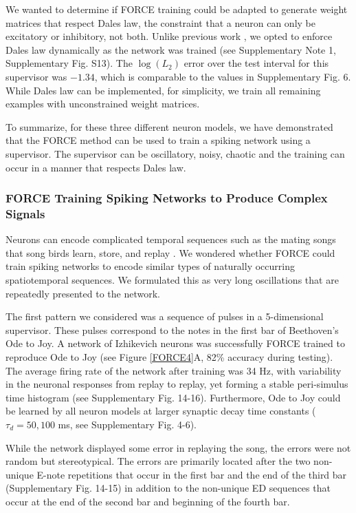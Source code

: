 \documentclass[11pt]{article} %
\begin{document}
We wanted to determine if FORCE training could be adapted to generate weight matrices that respect Dales law, the constraint that a neuron can only be excitatory or inhibitory, not both.  Unlike previous work \cite{FORCE2}, we opted to enforce Dales law dynamically as the network was trained (see Supplementary Note 1, Supplementary Fig. S13).  The $\log(L_2)$ error over the test interval for this supervisor was $-1.34$, which is comparable to the values in Supplementary Fig. 6.  While Dales law can be implemented, for simplicity, we train all remaining examples with unconstrained weight matrices.   

To summarize, for these three different neuron models, we have demonstrated that the FORCE method can be used to train a spiking network using a supervisor.  The supervisor can be oscillatory, noisy, chaotic and the training can occur in a manner that respects Dales law. 

\subsubsection*{FORCE Training Spiking Networks to Produce Complex Signals}

Neurons can encode complicated temporal sequences such as the mating songs that song birds learn, store, and replay \cite{Hanloser}.  We wondered whether FORCE could train spiking networks to encode similar types of naturally occurring spatiotemporal sequences.  We formulated this as very long oscillations that are repeatedly presented to the network.  

The first pattern we considered was a sequence of pulses in a 5-dimensional supervisor.  These pulses correspond to the notes in the first bar of Beethoven's Ode to Joy.  A network of Izhikevich neurons was successfully FORCE trained to reproduce Ode to Joy (see Figure \ref{FORCE4}A, 82\% accuracy during testing).  The average firing rate of the network after training was 34 Hz, with variability in the neuronal responses from replay to replay, yet forming a stable peri-simulus time histogram (see Supplementary Fig. 14-16).    Furthermore, Ode to Joy could be learned by all neuron models at larger synaptic decay time constants ($\tau_d = 50, 100$ ms, see Supplementary Fig. 4-6).  

While the network displayed some error in replaying the song, the errors were not random but stereotypical.  The errors are primarily located after the two non-unique E-note repetitions that occur in the first bar and the end of the third bar (Supplementary Fig. 14-15) in addition to the non-unique ED sequences that occur at the end of the second bar and beginning of the fourth bar.  
\end{document}

